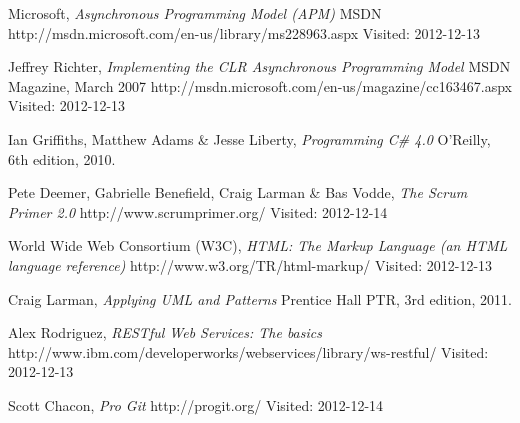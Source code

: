 
\begin{thebibliography}{99}

		Microsoft,
		\emph{Asynchronous Programming Model (APM)}\newline
		MSDN\newline
		http://msdn.microsoft.com/en-us/library/ms228963.aspx\newline
		Visited: 2012-12-13
	
		Jeffrey Richter,
		\emph{Implementing the CLR Asynchronous Programming Model}\newline
		MSDN Magazine,
		March 2007\newline
		http://msdn.microsoft.com/en-us/magazine/cc163467.aspx\newline
		Visited: 2012-12-13

		Ian Griffiths, Matthew Adams \& Jesse Liberty,
		\emph{Programming C\# 4.0}\newline
		O'Reilly, 6th edition, 2010.

		Pete Deemer, Gabrielle Benefield, Craig Larman \& Bas Vodde,
		\emph{The Scrum Primer 2.0}\newline
		http://www.scrumprimer.org/\newline
		Visited: 2012-12-14

		World Wide Web Consortium (W3C),
		\emph{HTML: The Markup Language (an HTML language reference)}\newline
		http://www.w3.org/TR/html-markup/\newline
		Visited: 2012-12-13
        
        Craig Larman,
        \emph{Applying UML and Patterns}\newline
        Prentice Hall PTR, 3rd edition, 2011.
        
        Alex Rodriguez,
        \emph{RESTful Web Services: The basics}\newline
        http://www.ibm.com/developerworks/webservices/library/ws-restful/\newline
        Visited: 2012-12-13
        
        Scott Chacon,
        \emph{Pro Git}\newline
        http://progit.org/\newline
        Visited: 2012-12-14
        

\end{thebibliography}
